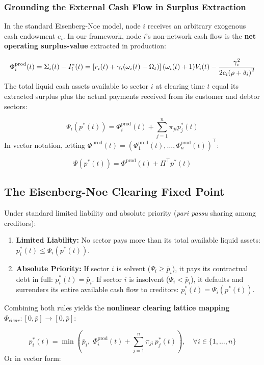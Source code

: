 \documentclass[11pt,letterpaper]{report}
\newcommand{\fitmath}[1]{\begingroup\setbox0=\hbox{$\displaystyle #1$}\ifdim\wd0>\linewidth\resizebox{\linewidth}{!}{$\displaystyle #1$}\else\displaystyle #1\fi\endgroup}
\begin{document}
\subsubsection{Grounding the External Cash Flow in Surplus Extraction}
In the standard Eisenberg-Noe model, node $i$ receives an arbitrary exogenous cash endowment ${e}_{i}$. In our framework, node $i$'s non-network cash flow is the \textbf{net operating surplus-value} extracted in production:

\[\fitmath{{\Phi }_{i}^{\mathrm{prod}}(t)={\Sigma }_{i}(t)-{I}_{i}^{*}(t)=\left[{{r}_{i}(t)+{\gamma }_{i}({\omega }_{i}(t)-{\Omega }_{t})}\right]({\omega }_{i}(t)+1){V}_{i}(t)-\frac{{\gamma }_{i}^{2}}{2{c}_{i}(\rho +{\delta }_{i}{)}^{2}}}\]
The total liquid cash assets available to sector $i$ at clearing time $t$ equal its extracted surplus plus the actual payments received from its customer and debtor sectors:

\[
{\Psi }_{i}({p}^{*}(t))={\Phi }_{i}^{\mathrm{prod}}(t)+\sum\limits_{j=1}^{n}{\pi }_{ji}{p}_{j}^{*}(t)
\]
In vector notation, letting $\Phi^{\text{prod}}(t) = (\Phi_1^{\text{prod}}(t), \dots, \Phi_n^{\text{prod}}(t))^\top$:

\[
\Psi ({p}^{*}(t))={\Phi }^{\mathrm{prod}}(t)+{\Pi }^{\top }{p}^{*}(t)
\]
\subsection{The Eisenberg-Noe Clearing Fixed Point}
Under standard limited liability and absolute priority (\emph{pari passu} sharing among creditors):

\begin{enumerate}
\item \textbf{Limited Liability:} No sector pays more than its total available liquid assets: ${p}_{i}^{*}(t)\leq {\Psi }_{i}({p}^{*}(t))$.
\item \textbf{Absolute Priority:} If sector $i$ is solvent (${\Psi }_{i}\geq {\bar{p}}_{i}$), it pays its contractual debt in full: ${p}_{i}^{*}(t)={\bar{p}}_{i}$. If sector $i$ is insolvent (${\Psi }_{i}<{\bar{p}}_{i}$), it defaults and surrenders its entire available cash flow to creditors: ${p}_{i}^{*}(t)={\Psi }_{i}({p}^{*}(t))$.
\end{enumerate}
Combining both rules yields the \textbf{nonlinear clearing lattice mapping} ${\Phi }_{clear}:[0,\bar{p}]\rightarrow [0,\bar{p}]$:

\[
p_i^*(t) = \min\left( \bar{p}_i, \; \Phi_i^{\text{prod}}(t) + \sum_{j=1}^n \pi_{ji} \, p_j^*(t) \right), \quad \forall i \in \{1, \dots, n\}
\]
Or in vector form:
\end{document}
